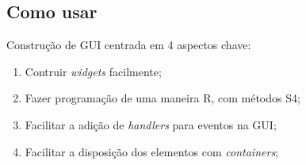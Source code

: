 
\subsection{Como usar}



\begin{frame}
  Construção de GUI centrada em 4 aspectos chave:
  \begin{enumerate}
  \item Contruir \textit{widgets} facilmente;
  \item Fazer programação de uma maneira R, com métodos S4;
  \item Facilitar a adição de \textit{handlers} para eventos na GUI;
  \item Facilitar a disposição dos elementos com \textit{containers};
  \end{enumerate}
\end{frame}

